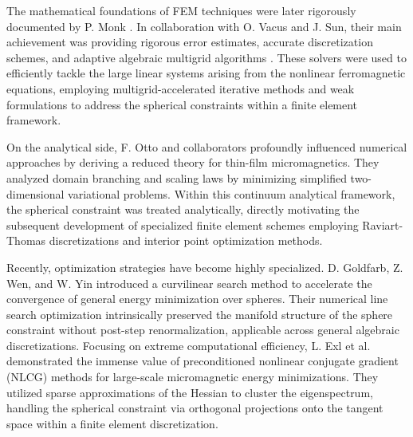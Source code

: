 \documentclass[10pt, a4paper, twocolumn]{article}
\begin{document}
The mathematical foundations of FEM techniques were later rigorously documented by P. Monk \cite{Monk2003}. In collaboration with O. Vacus and J. Sun, their main achievement was providing rigorous error estimates, accurate discretization schemes, and adaptive algebraic multigrid algorithms \cite{Monk1999, Monk2001, Sun2006}. These solvers were used to efficiently tackle the large linear systems arising from the nonlinear ferromagnetic equations, employing multigrid-accelerated iterative methods and weak formulations to address the spherical constraints within a finite element framework.

On the analytical side, F. Otto and collaborators \cite{DeSimone2002, Otto2006} profoundly influenced numerical approaches by deriving a reduced theory for thin-film micromagnetics. They analyzed domain branching and scaling laws by minimizing simplified two-dimensional variational problems. Within this continuum analytical framework, the spherical constraint was treated analytically, directly motivating the subsequent development of specialized finite element schemes employing Raviart-Thomas discretizations and interior point optimization methods.

Recently, optimization strategies have become highly specialized. D. Goldfarb, Z. Wen, and W. Yin \cite{Wen2009} introduced a curvilinear search method to accelerate the convergence of general energy minimization over spheres. Their numerical line search optimization intrinsically preserved the manifold structure of the sphere constraint without post-step renormalization, applicable across general algebraic discretizations. Focusing on extreme computational efficiency, L. Exl et al. \cite{Exl2014} demonstrated the immense value of preconditioned nonlinear conjugate gradient (NLCG) methods for large-scale micromagnetic energy minimizations. They utilized sparse approximations of the Hessian to cluster the eigenspectrum, handling the spherical constraint via orthogonal projections onto the tangent space within a finite element discretization.
\end{document}
